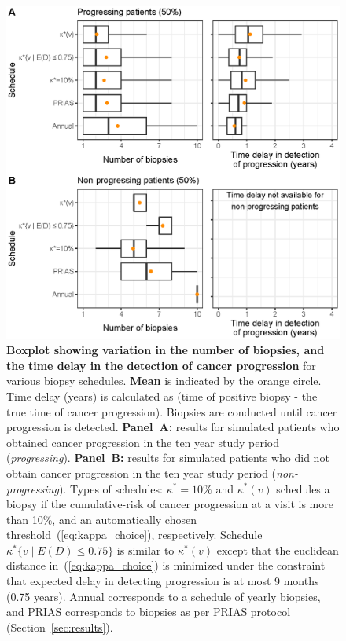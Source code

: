 \begin{figure}
\centerline{\includegraphics{images/simulation_boxplot.eps}}
\caption{\textbf{Boxplot showing variation in the number of biopsies, and the time delay in the detection of cancer progression} for various biopsy schedules. \textbf{Mean} is indicated by the orange circle. Time delay (years) is calculated as (time of positive biopsy - the true time of cancer progression). Biopsies are conducted until cancer progression is detected. \textbf{Panel~A:} results for simulated patients who obtained cancer progression in the ten year study period (\textit{progressing}). \textbf{Panel~B:} results for simulated patients who did not obtain cancer progression in the ten year study period (\textit{non-progressing}). Types of schedules: ${\kappa^*=10\%}$ and $\kappa^*(v)$ schedules a biopsy if the cumulative-risk of cancer progression at a visit is more than 10\%, and an automatically chosen threshold~(\ref{eq:kappa_choice}), respectively. Schedule ${\kappa^*\{v \mid E(D)\leq 0.75\}}$ is similar to $\kappa^*(v)$ except that the euclidean distance in~(\ref{eq:kappa_choice}) is minimized under the constraint that expected delay in detecting progression is at most 9 months (0.75 years). Annual corresponds to a schedule of yearly biopsies, and PRIAS corresponds to biopsies as per PRIAS protocol (Section~\ref{sec:results}).}
\label{fig:simulation_boxplot}
\end{figure}